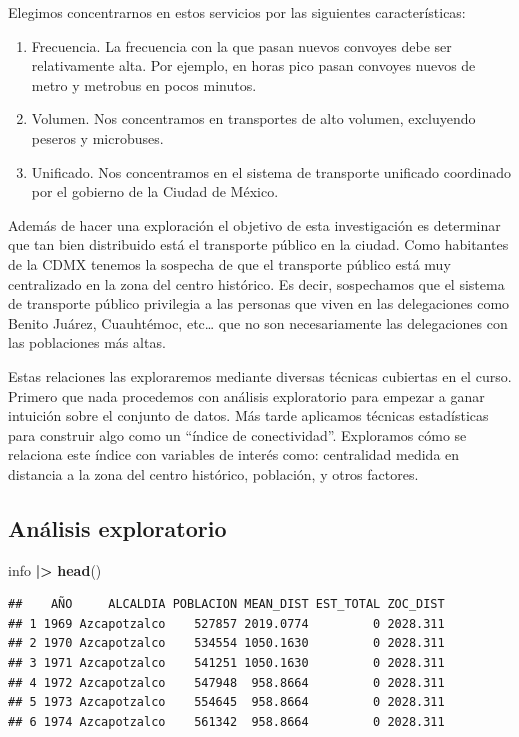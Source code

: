 \documentclass[
]{article}
\newenvironment{Shaded}{\begin{snugshade}}{\end{snugshade}}
\newcommand{\ErrorTok}[1]{\textcolor[rgb]{0.64,0.00,0.00}{\textbf{#1}}}
\newcommand{\KeywordTok}[1]{\textcolor[rgb]{0.13,0.29,0.53}{\textbf{#1}}}
\newcommand{\NormalTok}[1]{#1}
\newcommand{\OperatorTok}[1]{\textcolor[rgb]{0.81,0.36,0.00}{\textbf{#1}}}
\newcommand{\StringTok}[1]{\textcolor[rgb]{0.31,0.60,0.02}{#1}}
\begin{document}
Elegimos concentrarnos en estos servicios por las siguientes
características:

\begin{enumerate}
\def\labelenumi{\arabic{enumi}.}
\item
  Frecuencia. La frecuencia con la que pasan nuevos convoyes debe ser
  relativamente alta. Por ejemplo, en horas pico pasan convoyes nuevos
  de metro y metrobus en pocos minutos.
\item
  Volumen. Nos concentramos en transportes de alto volumen, excluyendo
  peseros y microbuses.
\item
  Unificado. Nos concentramos en el sistema de transporte unificado
  coordinado por el gobierno de la Ciudad de México.
\end{enumerate}

Además de hacer una exploración el objetivo de esta investigación es
determinar que tan bien distribuido está el transporte público en la
ciudad. Como habitantes de la CDMX tenemos la sospecha de que el
transporte público está muy centralizado en la zona del centro
histórico. Es decir, sospechamos que el sistema de transporte público
privilegia a las personas que viven en las delegaciones como Benito
Juárez, Cuauhtémoc, etc\ldots{} que no son necesariamente las
delegaciones con las poblaciones más altas.

Estas relaciones las exploraremos mediante diversas técnicas cubiertas
en el curso. Primero que nada procedemos con análisis exploratorio para
empezar a ganar intuición sobre el conjunto de datos. Más tarde
aplicamos técnicas estadísticas para construir algo como un ``índice de
conectividad''. Exploramos cómo se relaciona este índice con variables
de interés como: centralidad medida en distancia a la zona del centro
histórico, población, y otros factores.

\hypertarget{anuxe1lisis-exploratorio}{%
\subsection{Análisis exploratorio}\label{anuxe1lisis-exploratorio}}

\begin{Shaded}
\begin{Highlighting}[]
\NormalTok{info }\OperatorTok{|}\ErrorTok{\textgreater{}}\StringTok{ }\KeywordTok{head}\NormalTok{()}
\end{Highlighting}
\end{Shaded}

\begin{verbatim}
##    AÑO     ALCALDIA POBLACION MEAN_DIST EST_TOTAL ZOC_DIST
## 1 1969 Azcapotzalco    527857 2019.0774         0 2028.311
## 2 1970 Azcapotzalco    534554 1050.1630         0 2028.311
## 3 1971 Azcapotzalco    541251 1050.1630         0 2028.311
## 4 1972 Azcapotzalco    547948  958.8664         0 2028.311
## 5 1973 Azcapotzalco    554645  958.8664         0 2028.311
## 6 1974 Azcapotzalco    561342  958.8664         0 2028.311
\end{verbatim}
\end{document}
